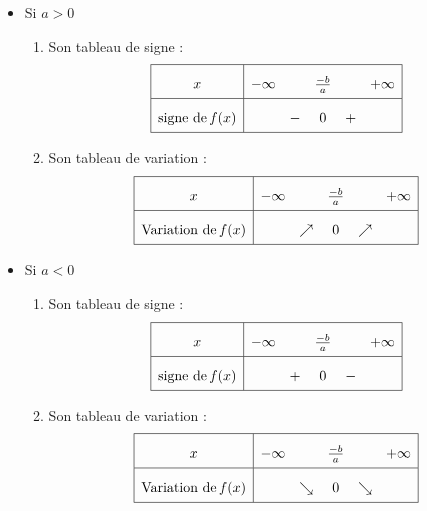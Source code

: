 \documentclass{article}
\begin{document}
\begin{itemize}
    \item Si \(a > 0\)
    \begin{enumerate}
        \item Son tableau de signe : 
        \[
        \renewcommand{\arraystretch}{2}
        \begin{array}{|c|ccccc|}
        \hline
        x & -\infty & & \frac{-b}{a} & & +\infty \\ \hline
        \text{signe de} \, f(x) & & - & 0 & + & \\ \hline
        \end{array}
        \]
        \vspace*{1cm}
        \item Son tableau de variation : 
        \[
        \renewcommand{\arraystretch}{2}
        \begin{array}{|c|ccccc|}
        \hline
        x & -\infty & & \frac{-b}{a} & & +\infty \\ \hline
        \text{Variation de} \, f(x) &  & \nearrow & 0 & \nearrow &  \\ \hline
        \end{array}
        \]
    \end{enumerate}
    
    \item Si \(a < 0\)
    \begin{enumerate}
        \item Son tableau de signe : 
        \[
        \renewcommand{\arraystretch}{2}
        \begin{array}{|c|ccccc|}
        \hline
        x & -\infty & & \frac{-b}{a} & & +\infty \\ \hline
        \text{signe de} \, f(x) & & + & 0 & - & \\ \hline
        \end{array}
        \]
        \vspace*{1cm}
        \item Son tableau de variation : 
        \[
        \renewcommand{\arraystretch}{2}
        \begin{array}{|c|ccccc|}
        \hline
        x & -\infty & & \frac{-b}{a} & & +\infty \\ \hline
        \text{Variation de} \, f(x) &  & \searrow & 0 & \searrow &  \\ \hline
        \end{array}
        \]
    \end{enumerate}
\end{itemize}
\end{document}
